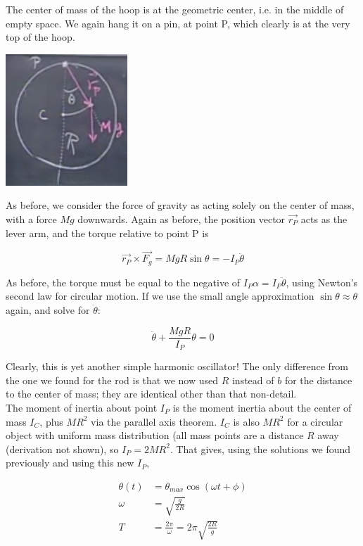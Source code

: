\documentclass[12pt,a4paper]{report}
\begin{document}
The center of mass of the hoop is at the geometric center, i.e. in the middle of empty space. We again hang it on a pin, at point P, which clearly is at the very top of the hoop.

\begin{center}
\includegraphics[scale=0.7]{Graphics/lec21_hoop_pendulum}
\end{center}

As before, we consider the force of gravity as acting solely on the center of mass, with a force $M g$ downwards. Again as before, the position vector $\vec{r_P}$ acts as the lever arm, and the torque relative to point P is

\begin{equation}
\vec{r_P} \times \vec{F_g} = M g R \sin \theta = -I_P \ddot{\theta}
\end{equation}

As before, the torque must be equal to the negative of $I_P \alpha = I_P \ddot{\theta}$, using Newton's second law for circular motion. If we use the small angle approximation $\sin \theta \approx \theta$ again, and solve for $\ddot{\theta}$:

\begin{equation}
\ddot{\theta} + \frac{M g R}{I_P} \theta = 0
\end{equation}

Clearly, this is yet another simple harmonic oscillator! The only difference from the one we found for the rod is that we now used $R$ instead of $b$ for the distance to the center of mass; they are identical other than that non-detail.\\
The moment of inertia about point $I_P$ is the moment inertia about the center of mass $I_C$, plus $M R^2$ via the parallel axis theorem. $I_C$ is also $M R^2$ for a circular object with uniform mass distribution (all mass points are a distance $R$ away (derivation not shown), so $I_P = 2 M R^2$. That gives, using the solutions we found previously and using this new $I_P$,

\begin{align}
\theta(t) &= \theta_{max} \cos(\omega t + \phi)\\
\omega    &= \sqrt{\frac{g}{2 R}}\\
T         &= \frac{2 \pi}{\omega} = 2 \pi \sqrt{\frac{2 R}{g}}
\end{align}
\end{document}
